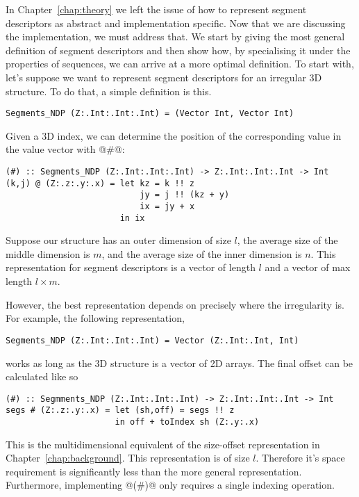 In Chapter~\ref{chap:theory} we left the issue of how to represent segment descriptors as abstract and implementation specific. Now that we are discussing the implementation, we must address that. We start by giving the most general definition of segment descriptors and then show how, by specialising it under the properties of sequences, we can arrive at a more optimal definition. To start with, let's suppose we want to represent segment descriptors for an irregular 3D structure. To do that, a simple definition is this.
%
\begin{lstlisting}[style=ndp]
Segments_NDP (Z:.Int:.Int:.Int) = (Vector Int, Vector Int)
\end{lstlisting}
%
Given a 3D index, we can determine the position of the corresponding value in the value vector with @#@:
%
\begin{lstlisting}[style=ndp]
(#) :: Segments_NDP (Z:.Int:.Int:.Int) -> Z:.Int:.Int:.Int -> Int
(k,j) @ (Z:.z:.y:.x) = let kz = k !! z
                           jy = j !! (kz + y)
                           ix = jy + x
                       in ix
\end{lstlisting}
%

Suppose our structure has an outer dimension of size $l$, the average size of the middle dimension is $m$, and the average size of the inner dimension is $n$. This representation for segment descriptors is a vector of length $l$ and a vector of max length $l \times m$.

However, the best representation depends on precisely where the irregularity is. For example, the following representation,
%
\begin{lstlisting}[style=ndp]
Segments_NDP (Z:.Int:.Int:.Int) = Vector (Z:.Int:.Int, Int)
\end{lstlisting}
%
works as long as the 3D structure is a vector of 2D arrays. The final offset can be calculated like so
%
\begin{lstlisting}[style=ndp]
(#) :: Segmments_NDP (Z:.Int:.Int:.Int) -> Z:.Int:.Int:.Int -> Int
segs # (Z:.z:.y:.x) = let (sh,off) = segs !! z
                      in off + toIndex sh (Z:.y:.x)
\end{lstlisting}
%
This is the multidimensional equivalent of the size-offset representation in Chapter~\ref{chap:background}. This representation is of size $l$. Therefore it's space requirement is significantly less than the more general representation. Furthermore, implementing @(#)@ only requires a single indexing operation.


